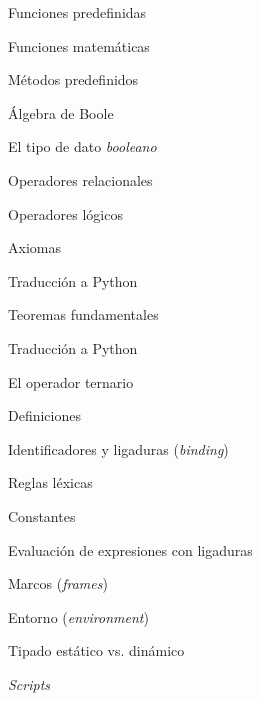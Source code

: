 \begin{longenum}
\begin{longenum}
\begin{longenum}
\begin{longenum}
\begin{longenum}
                \end{longenum}
                \item Funciones predefinidas
                \begin{longenum}
                    \item Funciones matemáticas
                \end{longenum}
                \item Métodos predefinidos
            \end{longenum}
        \end{longenum}
        \item Álgebra de Boole
        \begin{longenum}
            \item El tipo de dato \textit{booleano}
            \item Operadores relacionales
            \item Operadores lógicos
            \item Axiomas
            \begin{longenum}
                \item Traducción a Python
            \end{longenum}
            \item Teoremas fundamentales
            \begin{longenum}
                \item Traducción a Python
            \end{longenum}
            \item El operador ternario
        \end{longenum}
        \item Definiciones
        \begin{longenum}
            \item Identificadores y ligaduras (\textit{binding})
            \begin{longenum}
                \item Reglas léxicas
                \item Constantes
            \end{longenum}
            \item Evaluación de expresiones con ligaduras
            \item Marcos (\textit{frames})
            \item Entorno (\textit{environment})
            \item Tipado estático vs. dinámico
            \item \textit{Scripts}

\end{longenum}
\end{longenum}
\end{longenum}
